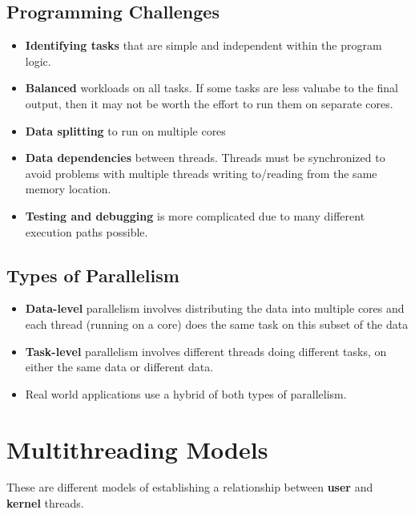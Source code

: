 \documentclass{article}
\theoremstyle{plain}
\theoremstyle{definition}
\begin{document}
\subsection{Programming Challenges}
\begin{itemize}
    \item \textbf{Identifying tasks} that are simple and independent within the program logic.
    
    \item \textbf{Balanced} workloads on all tasks. If some tasks are less valuabe to the final output, then it may not be worth the effort to run them on separate cores.
    
    \item \textbf{Data splitting} to run on multiple cores
    
    \item \textbf{Data dependencies} between threads. Threads must be synchronized to avoid problems with multiple threads writing to/reading from the same memory location.
    
    \item \textbf{Testing and debugging} is more complicated due to many different execution paths possible. 
\end{itemize}

\subsection{Types of Parallelism}
\begin{itemize}
    \item \textbf{Data-level} parallelism involves distributing the data into multiple cores and each thread (running on a core) does the same task on this subset of the data
    
    \item \textbf{Task-level} parallelism involves different threads doing different tasks, on either the same data or different data.
    
    \item Real world applications use a hybrid of both types of parallelism.
\end{itemize}

\section{Multithreading Models}
These are different models of establishing a relationship between \textbf{user} and \textbf{kernel} threads.
\end{document}
